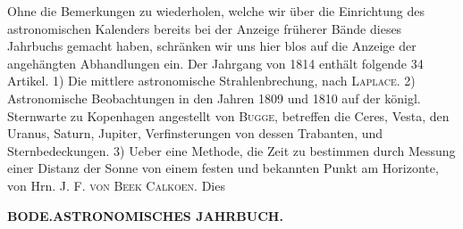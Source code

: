 Ohne die Bemerkungen zu wiederholen, welche wir über die Einrichtung des astronomischen Kalenders bereits bei der Anzeige früherer Bände dieses Jahrbuchs gemacht haben, schränken wir uns hier blos auf die Anzeige der angehängten Abhandlungen ein. Der Jahrgang von 1814 enthält folgende 34 Artikel. 1) Die mittlere astronomische Strahlenbrechung, nach \textsc{Laplace}. 2) Astronomische Beobachtungen in den Jahren 1809 und 1810 auf der königl. Sternwarte zu Kopenhagen angestellt von \textsc{Bugge}, betreffen die Ceres, Vesta, den Uranus, Saturn, Jupiter, Verfinsterungen von dessen Trabanten, und Sternbedeckungen. 3) Ueber eine Methode, die Zeit zu bestimmen durch Messung einer Distanz der Sonne von einem festen und bekannten Punkt am Horizonte, von Hrn. J. F. \textsc{von Beek Calkoen}. Dies\par
\clearpage
\thispagestyle{empty}
\noindent{}%
\makebox[12mm][l]{}%
\parbox[t]{\dimexpr\linewidth-24mm\relax}{\centering\footnotesize\bfseries BODE.\enspace ASTRONOMISCHES JAHRBUCH.\par}%
\par\medskip
